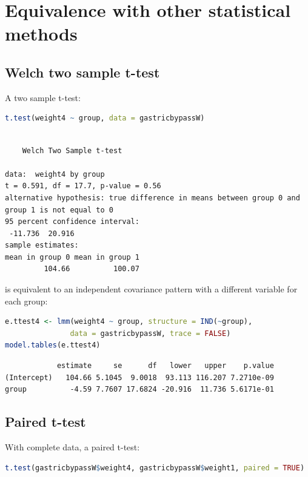 \documentclass[12pt]{article}
\begin{document}
\clearpage
\section{Equivalence with other statistical methods}
\label{sec:org5660cf0}
\subsection{Welch two sample t-test}
\label{sec:orgd25d0f1}

A two sample t-test:
\begin{lstlisting}[language=r,numbers=none]
t.test(weight4 ~ group, data = gastricbypassW)
\end{lstlisting}

\label{}
\begin{verbatim}

	Welch Two Sample t-test

data:  weight4 by group
t = 0.591, df = 17.7, p-value = 0.56
alternative hypothesis: true difference in means between group 0 and group 1 is not equal to 0
95 percent confidence interval:
 -11.736  20.916
sample estimates:
mean in group 0 mean in group 1 
         104.66          100.07
\end{verbatim}

is equivalent to an independent covariance pattern with a different
variable for each group:
\begin{lstlisting}[language=r,numbers=none]
e.ttest4 <- lmm(weight4 ~ group, structure = IND(~group), 
               data = gastricbypassW, trace = FALSE)
model.tables(e.ttest4)
\end{lstlisting}

\label{}
\begin{verbatim}
            estimate     se      df   lower   upper    p.value
(Intercept)   104.66 5.1045  9.0018  93.113 116.207 7.2710e-09
group          -4.59 7.7607 17.6824 -20.916  11.736 5.6171e-01
\end{verbatim}


\clearpage
\subsection{Paired t-test}
\label{sec:orgc99c99d}

With complete data, a paired t-test:
\begin{lstlisting}[language=r,numbers=none]
t.test(gastricbypassW$weight4, gastricbypassW$weight1, paired = TRUE)
\end{lstlisting}
\end{document}
